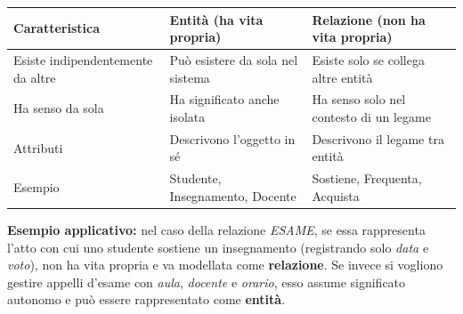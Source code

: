 \begin{center}
\begin{tabular}{|p{3.2cm}|p{5.3cm}|p{5.3cm}|}
\hline
\textbf{Caratteristica} & \textbf{Entità (ha vita propria)} & \textbf{Relazione (non ha vita propria)} \\
\hline
Esiste indipendentemente da altre & Può esistere da sola nel sistema & Esiste solo se collega altre entità \\
\hline
Ha senso da sola & Ha significato anche isolata & Ha senso solo nel contesto di un legame \\
\hline
Attributi & Descrivono l’oggetto in sé & Descrivono il legame tra entità \\
\hline
Esempio & Studente, Insegnamento, Docente & Sostiene, Frequenta, Acquista \\
\hline
\end{tabular}
\end{center}

\noindent
\textbf{Esempio applicativo:} nel caso della relazione \textit{ESAME}, se essa rappresenta l'atto con cui
uno studente sostiene un insegnamento (registrando solo \textit{data} e \textit{voto}),
non ha vita propria e va modellata come \textbf{relazione}.
Se invece si vogliono gestire appelli d’esame con \textit{aula}, \textit{docente} e \textit{orario}, 
esso assume significato autonomo e può essere rappresentato come \textbf{entità}.





